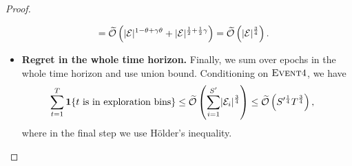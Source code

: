 \begin{proof}
\begin{itemize}[leftmargin=*]
\begin{align*}
&=\widetilde{\mathcal{O}}\left(\lvert{\mathcal{E}}\rvert^{1-\theta+\gamma\theta} + \lvert{\mathcal{E}}\rvert^{\frac{1}{2}+\frac{1}{2}\gamma}\right)=\widetilde{\mathcal{O}}\left(\lvert{\mathcal{E}}\rvert^{\frac{3}{4}}\right). 
\end{align*}
\item \textbf{Regret in the whole time horizon.}
Finally, we sum over epochs in the whole time horizon and use union bound. Conditioning on $\textsc{Event} 4$, we have
\begin{align*}
\sum_{t=1}^T \boldsymbol{1}\{t \text{ is in exploration bins}\} &\leq \widetilde{\mathcal{O}}\left( \sum_{i=1}^{S^\prime} \lvert{\mathcal{E}}_i\rvert^{\frac{3}{4}}\right)\leq\widetilde{\mathcal{O}}\left( S^{\prime \frac{1}{4}} T^{\frac{3}{4}}\right), 
\end{align*}
where in the final step we use H{\"o}lder's inequality.
\end{itemize}
\end{proof}

